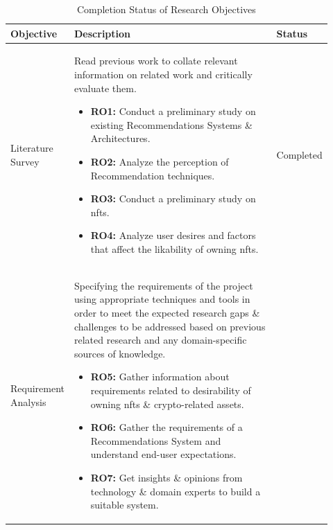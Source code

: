 \vspace{-4mm}
\begin{longtable}{| p{0.135\linewidth} | p{0.63\linewidth}| p{0.15\linewidth}|}
\caption{Completion Status of Research Objectives}
\label{tab:research-objectives-status-table}\\
\hline
Objective &  Description & Status \\ 
\hline
Literature Survey & Read previous work to collate relevant information on related work and critically evaluate them.
\begin{itemize}
\item \textbf{RO1:} Conduct a preliminary study on existing Recommendations Systems \& Architectures.
\item \textbf{RO2:} Analyze the perception of Recommendation techniques.
\item \textbf{RO3:} Conduct a preliminary study on \Gls{nft}s.
\item \textbf{RO4:} Analyze user desires and factors that affect the likability of owning \Gls{nft}s.
\vspace{-7mm}       %
\end{itemize}
&
Completed\\
\hline
Requirement Analysis &  Specifying the requirements of the project using appropriate techniques and tools in order to meet the expected research gaps \& challenges to be addressed based on previous related research and any domain-specific sources of knowledge.
\begin{itemize}
\item \textbf{RO5:} Gather information about requirements related to desirability of owning \Gls{nft}s \& crypto-related assets.
\item \textbf{RO6:} Gather the requirements of a Recommendations System and understand end-user expectations.
\item \textbf{RO7:} Get insights \&  opinions from technology \& domain experts to build a suitable system.
\vspace{-7mm}       %

\end{itemize}
\end{longtable}

